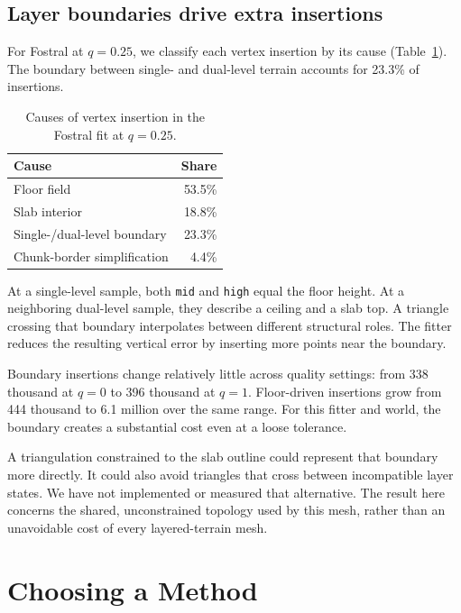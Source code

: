 \documentclass{jcgt}
\newcommand{\code}[1]{\texttt{#1}}
\begin{document}
\subsection{Layer boundaries drive extra insertions}\label{sec:boundary}

For Fostral at $q=0.25$, we classify each vertex insertion by its cause (Table~\ref{tab:insertions}). The boundary between single- and dual-level terrain accounts for 23.3\% of insertions.

\begin{table}[tbp]\centering\small
\caption{Causes of vertex insertion in the Fostral fit at $q=0.25$.}\label{tab:insertions}
\begin{tabular}{@{}lr@{}}
\toprule
Cause & Share \\
\midrule
Floor field & 53.5\% \\
Slab interior & 18.8\% \\
Single-/dual-level boundary & 23.3\% \\
Chunk-border simplification & 4.4\% \\
\bottomrule
\end{tabular}
\end{table}

At a single-level sample, both \code{mid} and \code{high} equal the floor height. At a neighboring dual-level sample, they describe a ceiling and a slab top. A triangle crossing that boundary interpolates between different structural roles. The fitter reduces the resulting vertical error by inserting more points near the boundary.

Boundary insertions change relatively little across quality settings: from 338 thousand at $q=0$ to 396 thousand at $q=1$. Floor-driven insertions grow from 444 thousand to 6.1 million over the same range. For this fitter and world, the boundary creates a substantial cost even at a loose tolerance.

A triangulation constrained to the slab outline could represent that boundary more directly. It could also avoid triangles that cross between incompatible layer states. We have not implemented or measured that alternative. The result here concerns the shared, unconstrained topology used by this mesh, rather than an unavoidable cost of every layered-terrain mesh.

\FloatBarrier
\section{Choosing a Method}\label{sec:choice}
\end{document}

